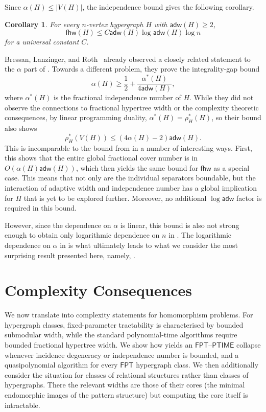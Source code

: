 \documentclass[11pt,letterpaper]{article}
\newtheorem{corollary}[corollary]{Corollary}
\theoremstyle{definition}
\theoremstyle{remark}
\newcommand{\fhw}{\mathsf{fhw}}
\newcommand{\adw}{\mathsf{adw}}
\newcommand{\FPT}{\ensuremath{\mathsf{FPT}}}
\newcommand{\PTIME}{\mathsf{PTIME}}
\providecommand{\adw}{\operatorname{adw}}
\providecommand{\fhw}{\operatorname{fhw}}
\providecommand{\FPT}{\ensuremath{\mathsf{FPT}}}
\providecommand{\PTIME}{\mathsf{PTIME}}
\begin{document}
Since $\alpha(H)\le |V(H)|$, the independence bound gives the following corollary.

\begin{corollary}
\label{cor:stoc-universal-bridge}
For every $n$-vertex hypergraph $H$ with $\adw(H)\ge2$,
\[
 \fhw(H)\le C\adw(H)\log\adw(H)\log n
\]
for a universal constant $C$.
\end{corollary}


Bressan, Lanzinger, and Roth~\cite{BressanLanzingerRoth2023} already observed a closely related statement to the $\alpha$ part of . Towards a different problem, they prove the integrality-gap bound
\[
 \alpha(H)\ge\frac12+\frac{\alpha^*(H)}{4\adw(H)},
\]
where $\alpha^*(H)$ is the fractional independence number of $H$.
While they did not observe the connections to fractional hypertree width or the complexity theoretic consequences, by linear programming duality, $\alpha^*(H)=\rho_H^*(H)$, so their bound also shows
\[
 \rho_H^*(V(H))\le (4\alpha(H)-2)\adw(H).
\]
This is incomparable to the bound from  in a number of interesting ways. First, this shows that the entire global fractional cover number is in $O(\alpha(H) \adw(H))$, which then yields the same bound for $\fhw$ as a special case. This means that not only are the individual separators boundable, but the interaction of adaptive width and independence number has a global implication for $H$ that is yet to be explored further. Moreover, no additional $\log \adw$ factor is required in this bound.

However, since the dependence on $\alpha$ is linear, this bound is also not strong enough to obtain only logarithmic dependence on $n$ in . The logarithmic dependence on $\alpha$ in  is what ultimately leads to what we consider the most surprising result presented here, namely, .

\section{Complexity Consequences}
\label{sec:consequences}

We now translate  into complexity statements for
homomorphism problems. For hypergraph classes, fixed-parameter tractability is characterised by bounded submodular width, while the standard polynomial-time algorithms require bounded fractional hypertree width. We show how   yields an $\FPT$--$\PTIME$
collapse whenever incidence degeneracy or independence number is bounded,  and a quasipolynomial algorithm for
every $\FPT$ hypergraph class. We then additionally consider the situation for classes of relational structures rather than classes of hypergraphs. There the relevant widths are those of their cores (the minimal endomorphic images of the pattern structure) but computing the core itself is intractable.
\end{document}
